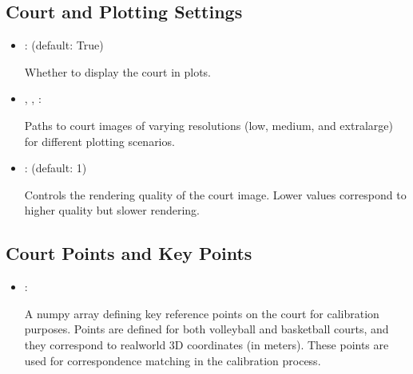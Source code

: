 \documentclass[letterpaper,10pt,english]{sphinxmanual}
\begin{document}
\subsection{Court and Plotting Settings}
\label{\detokenize{conf:court-and-plotting-settings}}\begin{itemize}
\item {} 
\sphinxAtStartPar
{}:  (default: True)

\sphinxAtStartPar
Whether to display the court in plots.

\item {} 
\sphinxAtStartPar
{}, , : 

\sphinxAtStartPar
Paths to court images of varying resolutions (low, medium, and extra\sphinxhyphen{}large) for different plotting scenarios.

\item {} 
\sphinxAtStartPar
{}:  (default: 1)

\sphinxAtStartPar
Controls the rendering quality of the court image. Lower values correspond to higher quality but slower rendering.

\end{itemize}


\subsection{Court Points and Key Points}
\label{\detokenize{conf:court-points-and-key-points}}\begin{itemize}
\item {} 
\sphinxAtStartPar
{}: 

\sphinxAtStartPar
A numpy array defining key reference points on the court for calibration purposes. Points are defined for both volleyball and basketball courts, and they correspond to real\sphinxhyphen{}world 3D coordinates (in meters). These points are used for correspondence matching in the calibration process.

\end{itemize}
\end{document}
